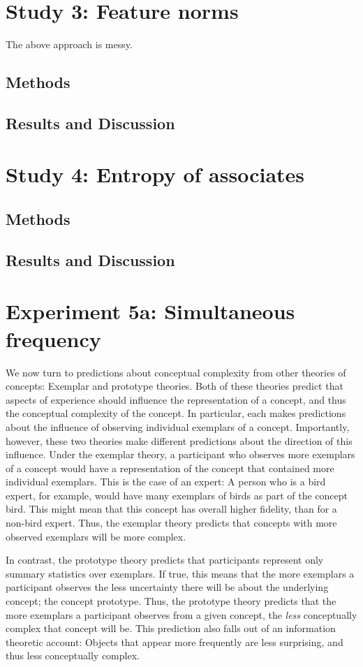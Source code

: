 \section{Study 3: Feature norms}
The above approach is messy. 

\subsection{Methods}
\subsection{Results and Discussion}

\section{Study 4: Entropy of associates}
\subsection{Methods}

\subsection{Results and Discussion}

\section{Experiment 5a: Simultaneous frequency}
We now turn to predictions about conceptual complexity from other theories of concepts: Exemplar and prototype theories. Both of these theories predict that aspects of experience should influence the representation of a concept, and thus the conceptual complexity of the concept. In particular, each makes predictions about the influence of observing individual exemplars of a concept.  Importantly, however, these two theories make different predictions about the direction of this influence. Under the exemplar theory, a participant who observes more exemplars of a concept would have a representation of the concept that contained more individual exemplars. This is the case of an expert: A person who is a bird expert, for example, would have many exemplars of birds as part of the concept bird. This might mean that this concept has overall higher fidelity, than for a non-bird expert. Thus, the exemplar theory predicts that concepts with more observed exemplars will be more complex.

In contrast, the prototype theory predicts that participants represent only summary statistics over exemplars. If true, this means that the more exemplars a participant observes the less uncertainty there will be about the underlying concept; the concept prototype. Thus, the prototype theory predicts that the more exemplars a participant observes from a given concept, the {\it less} conceptually complex that concept will be. This prediction also falls out of an information theoretic account: Objects that appear more frequently are less surprising, and thus less conceptually complex.

